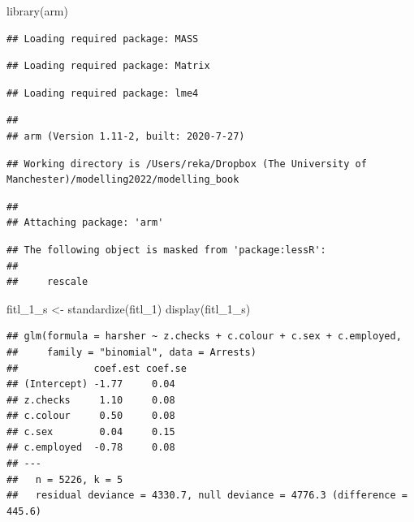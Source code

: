 \documentclass[
]{book}
\newenvironment{Shaded}{\begin{snugshade}}{\end{snugshade}}
\newcommand{\FunctionTok}[1]{\textcolor[rgb]{0.00,0.00,0.00}{#1}}
\newcommand{\NormalTok}[1]{#1}
\newcommand{\OtherTok}[1]{\textcolor[rgb]{0.56,0.35,0.01}{#1}}
\begin{document}
\begin{Shaded}
\begin{Highlighting}[]
\FunctionTok{library}\NormalTok{(arm)}
\end{Highlighting}
\end{Shaded}

\begin{verbatim}
## Loading required package: MASS
\end{verbatim}

\begin{verbatim}
## Loading required package: Matrix
\end{verbatim}

\begin{verbatim}
## Loading required package: lme4
\end{verbatim}

\begin{verbatim}
## 
## arm (Version 1.11-2, built: 2020-7-27)
\end{verbatim}

\begin{verbatim}
## Working directory is /Users/reka/Dropbox (The University of Manchester)/modelling2022/modelling_book
\end{verbatim}

\begin{verbatim}
## 
## Attaching package: 'arm'
\end{verbatim}

\begin{verbatim}
## The following object is masked from 'package:lessR':
## 
##     rescale
\end{verbatim}

\begin{Shaded}
\begin{Highlighting}[]
\NormalTok{fitl\_1\_s }\OtherTok{\textless{}{-}} \FunctionTok{standardize}\NormalTok{(fitl\_1)}
\FunctionTok{display}\NormalTok{(fitl\_1\_s)}
\end{Highlighting}
\end{Shaded}

\begin{verbatim}
## glm(formula = harsher ~ z.checks + c.colour + c.sex + c.employed, 
##     family = "binomial", data = Arrests)
##             coef.est coef.se
## (Intercept) -1.77     0.04  
## z.checks     1.10     0.08  
## c.colour     0.50     0.08  
## c.sex        0.04     0.15  
## c.employed  -0.78     0.08  
## ---
##   n = 5226, k = 5
##   residual deviance = 4330.7, null deviance = 4776.3 (difference = 445.6)
\end{verbatim}
\end{document}
